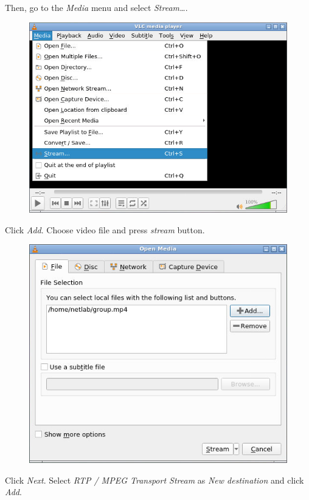 \documentclass{../UTNetLab}
\begin{document}
Then, go to the \textit{Media} menu and select \textit{Stream\ldots}.
\begin{figure}[H]
    \centering
    \includegraphics[scale=1.8]{img/open-stream}
\end{figure}
Click \textit{Add}. Choose video file  and press \textit{stream} button.
\begin{figure}[H]
    \centering
    \includegraphics[scale=1.8]{img/stream}
\end{figure}
Click \textit{Next}.
Select \textit{RTP / MPEG Transport Stream} as \textit{New destination} and
click \textit{Add}.
\end{document}
